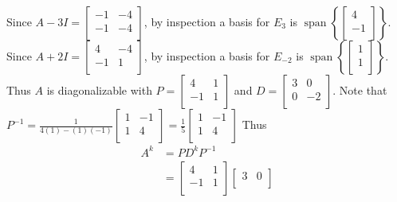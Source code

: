 \documentclass{article}
\DeclareMathOperator{\spn}{span}
\begin{document}
\begin{example}
      Since $A - 3I =
      \begin{bmatrix}
        -1 & -4\\
        -1 & -4\\
      \end{bmatrix}$, by inspection a basis for $E_3$ is $\spn\left\{
        \begin{bmatrix}
          4\\-1\\
      \end{bmatrix}\right\}$. Since $A + 2I =
      \begin{bmatrix}
        4 & -4\\
        -1 & 1\\
      \end{bmatrix}$, by inspection a basis for $E_{-2}$ is $\spn\left\{
        \begin{bmatrix}
          1\\1\\
      \end{bmatrix}\right\}$. Thus $A$ is diagonalizable with $P =
      \begin{bmatrix}
        4 & 1\\
        -1 & 1\\
      \end{bmatrix}$ and $D =
      \begin{bmatrix}
        3 & 0\\
        0 & -2\\
      \end{bmatrix}$. Note that $P^{-1} = \frac{1}{4(1) - (1)(-1)}
      \begin{bmatrix}
        1 & -1\\
        1 & 4\\
      \end{bmatrix} = \frac{1}{5}
      \begin{bmatrix}
        1 & -1\\
        1 & 4\\
      \end{bmatrix}$
      Thus
      \begin{align*}
        A^k &= PD^kP^{-1}\\
        &=
        \begin{bmatrix}
          4 & 1\\
          -1 & 1\\
        \end{bmatrix}
        \begin{bmatrix}
          3 & 0\\

\end{bmatrix}
\end{align*}
\end{example}
\end{document}
